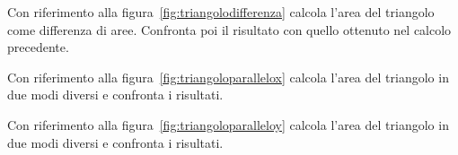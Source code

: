  \begin{esempio}
  Con riferimento alla figura~\ref{fig:triangolodifferenza} calcola 
  l'area del triangolo come differenza di aree.
  Confronta poi il risultato con quello ottenuto nel calcolo precedente.
 \end{esempio}

 \begin{esempio}
  Con riferimento alla figura~\ref{fig:triangoloparallelox} calcola 
  l'area del triangolo in due modi diversi e confronta i risultati.
 \end{esempio}

 \begin{esempio}
  Con riferimento alla figura~\ref{fig:triangoloparalleloy} calcola 
  l'area del triangolo in due modi diversi e confronta i risultati.
 \end{esempio}

% 
